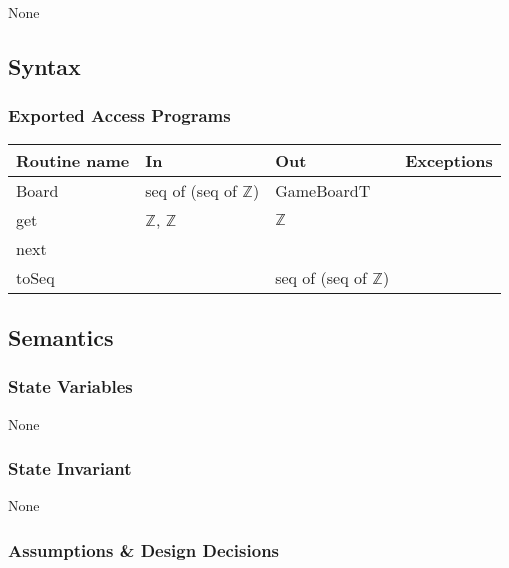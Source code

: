 \documentclass[12pt]{article}
\begin{document}
None

\subsection* {Syntax}

\subsubsection* {Exported Access Programs}

\begin{tabular}{| l | l | l | l |}
\hline
\textbf{Routine name} & \textbf{In} & \textbf{Out} & \textbf{Exceptions}\\

\hline
Board  & seq of (seq of $\mathbb{Z}$)& GameBoardT & ~\\
\hline
get & $\mathbb{Z}$, $\mathbb{Z}$ &$\mathbb{Z}$ & ~\\

\hline
next & ~ & & ~\\
\hline
toSeq & ~ & seq of (seq of $\mathbb{Z}$) & \\

\hline
\end{tabular}

\subsection* {Semantics}

\subsubsection* {State Variables}

None

\subsubsection* {State Invariant}

None
\subsubsection* {Assumptions \& Design Decisions}
\end{document}
